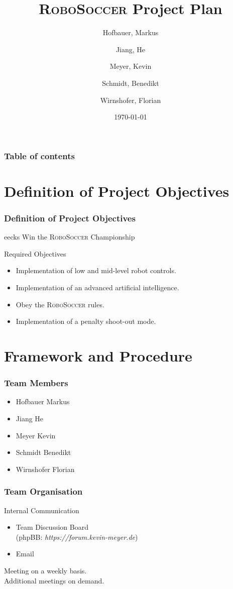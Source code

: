 \documentclass[hyperref={pdfpagelabels=false}]{beamer}
\title{\textsc{RoboSoccer} Project Plan}
\author{
  Hofbauer, Markus\\
  \and
  Jiang, He \\
  \and
  Meyer, Kevin\\
  \and
  Schmidt, Benedikt\\
  \and
  Wirnshofer, Florian
}
\date{\today}
\begin{document}
\begin{frame}
\titlepage
\end{frame} 

%
\begin{frame}
\frametitle{Table of contents}
\tableofcontents
\end{frame} 

\section{Definition of Project Objectives} 
\begin{frame}
	\frametitle{Definition of Project Objectives} 
	
	\begin{beamercolorbox}[shadow=true, rounded=true]{eecks}
		\centering		
		\Large{Win the \textsc{RoboSoccer} Championship}
	\end{beamercolorbox}
	\vspace{1cm}
	\begin{block}{Required Objectives}
		\begin{itemize}
			\item Implementation of low and mid-level robot controls.
			\item Implementation of an advanced artificial intelligence.
			\item Obey the \textsc{RoboSoccer} rules.
			\item Implementation of a penalty shoot-out mode.
		\end{itemize}
	\end{block}
\end{frame}

\section{Framework and Procedure} 


\begin{frame}
	\frametitle{Team Members}
	\begin{itemize}
		\item  Hofbauer Markus
  		\item Jiang He 
 		\item Meyer Kevin
  		\item Schmidt Benedikt
  		\item Wirnshofer Florian
	\end{itemize}
\end{frame}

\begin{frame}
	\frametitle{Team Organisation}
	Internal Communication\\
	\begin{itemize}
		\item  Team Discussion Board \\
		(phpBB: \textit{https://forum.kevin-meyer.de})
  		\item Email
	\end{itemize}
	\vspace{0.75cm}	
	Meeting on a weekly basis.\\
	\vspace{0.75cm}
	Additional meetings on demand.
\end{frame}
\end{document}
